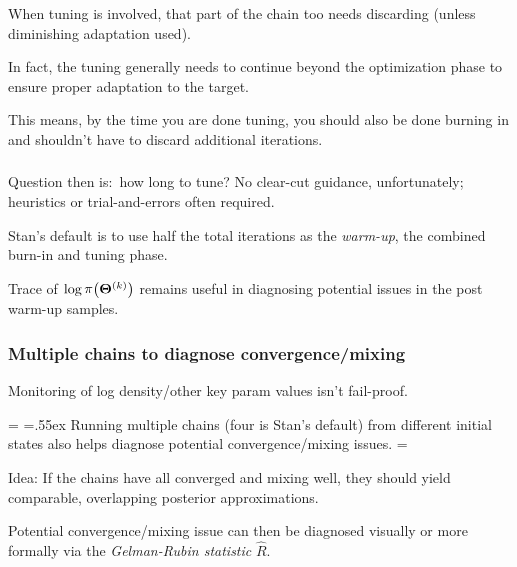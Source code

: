 \documentclass[18pt]{beamer}
\newcommand{\tightSpacing}[2][.55ex]{%
  \begingroup%
    \dimen0=\fontdimen2\font
    \fontdimen2\font=#1
    #2%
    \fontdimen2\font=\dimen0
  \endgroup%
}
\newcommand{\thinnerspace}{\mskip.5\thinmuskip}
\DeclareMathOperator{\density}{\pi}
\newcommand{\randVar}{\Theta}
\newcommand{\brandVar}{\bm{\randVar}}
\newcommand{\mcIndex}{k}
\begin{document}
\begin{frame}
\frametitle{\frametitleText}
When tuning is involved, that part of the chain too needs discarding (unless diminishing adaptation used).

In fact, the tuning generally needs to continue beyond the optimization phase to ensure proper adaptation to the target.

\vspace*{9pt}
This means, by the time you are done tuning, you should also be done burning in and shouldn't have to discard additional iterations.
\end{frame}


\begin{frame}
\frametitle{\frametitleText}
Question then is:~how long to tune?
No clear-cut guidance, unfortunately; heuristics or trial-and-errors often required.

\pause
Stan's default is to use half the total iterations as the \textit{warm-up}, the combined burn-in and tuning phase.

\vspace*{9pt}
Trace of $\thinnerspace \log \density\bigl(\brandVar^{(\mcIndex)} \bigr)$ remains useful in diagnosing potential issues in the post warm-up samples. 
\end{frame}


\renewcommand{\frametitleText}{Multiple chains to diagnose convergence/mixing}
\begin{frame}
\frametitle{\frametitleText}
Monitoring of log density/other key param values isn't fail-proof.

\tightSpacing{%
Running multiple chains (four is Stan's default) from different initial states also helps diagnose potential convergence/mixing issues.
}

\pause
\vspace*{10pt}
Idea: If the chains have all converged and mixing well, they should yield comparable, overlapping posterior approximations.

\pause
\vspace*{10pt}
Potential convergence/mixing issue can then be diagnosed visually or more formally via the \textit{Gelman-Rubin statistic} $\hat{R}$.\\
{\hfill \citep{gelman1992rhat, vehtari2021improved_rhat}}
\end{frame}
\end{document}
